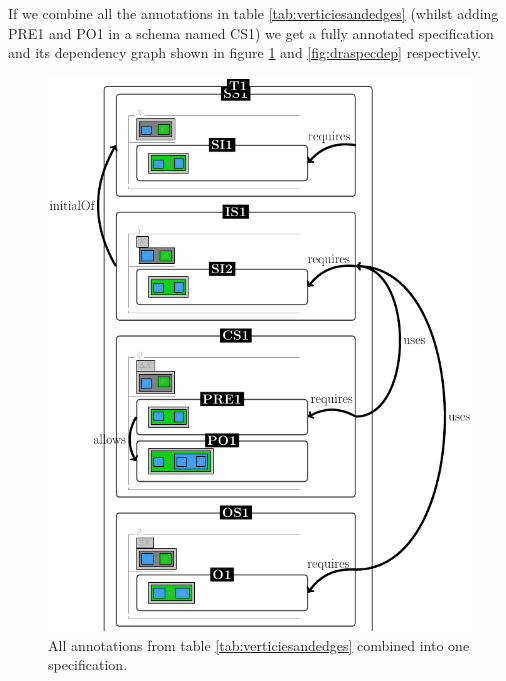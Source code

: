 If we combine all the annotations in table \ref{tab:verticiesandedges} (whilst
adding PRE1 and PO1 in a schema named CS1) we get a fully annotated
specification and its dependency graph shown in figure \ref{fig:draspec} and
\ref{fig:draspecdep} respectively.

\begin{figure}[H]
\centering
\begin{minipage}{0.45\textwidth}
\centering
\includegraphics[scale=0.3]{Figures/Formalising/draspec.png}
\caption{All annotations from table \ref{tab:verticiesandedges} combined into one specification.  \label{fig:draspec}}
\end{minipage}\hfill
\begin{minipage}{0.45\textwidth}
\centering

\end{minipage}
\end{figure}
